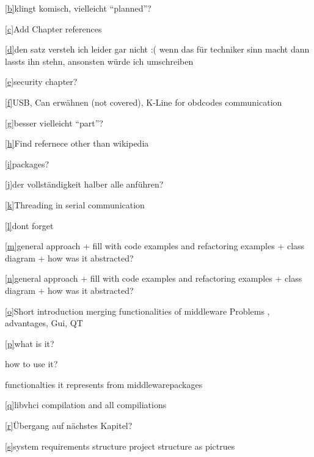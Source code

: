 \protect\hyperlink{cmntux5fref2}{{[}b{]}}{klingt komisch, vielleicht
``planned''?}

\protect\hyperlink{cmntux5fref3}{{[}c{]}}{Add Chapter references}

\protect\hyperlink{cmntux5fref4}{{[}d{]}}{den satz versteh ich leider
gar nicht :( wenn das für techniker sinn macht dann lassts ihn stehn,
ansonsten würde ich umschreiben}

\protect\hyperlink{cmntux5fref5}{{[}e{]}}{security chapter?}

\protect\hyperlink{cmntux5fref6}{{[}f{]}}{USB, Can erwähnen (not
covered), K-Line for obdcodes communication}

\protect\hyperlink{cmntux5fref7}{{[}g{]}}{besser vielleicht ``part''?}

\protect\hyperlink{cmntux5fref8}{{[}h{]}}{Find refernece other than
wikipedia}

\protect\hyperlink{cmntux5fref9}{{[}i{]}}{packages?}

\protect\hyperlink{cmntux5fref10}{{[}j{]}}{der vollständigkeit halber
alle anführen?}

\protect\hyperlink{cmntux5fref11}{{[}k{]}}{Threading in serial
communication}

\protect\hyperlink{cmntux5fref12}{{[}l{]}}{dont forget}

\protect\hyperlink{cmntux5fref13}{{[}m{]}}{general approach + fill with
code examples and refactoring examples + class diagram + how was it
abstracted?}

\protect\hyperlink{cmntux5fref14}{{[}n{]}}{general approach + fill with
code examples and refactoring examples + class diagram + how was it
abstracted?}

\protect\hyperlink{cmntux5fref15}{{[}o{]}}{Short introduction merging
functionalities of middleware Problems , advantages, Gui, QT}

\protect\hyperlink{cmntux5fref16}{{[}p{]}}{what is it?}

{how to use it?}

{functionalties it represents from middlewarepackages}

\protect\hyperlink{cmntux5fref17}{{[}q{]}}{libvhci compilation and all
compiliations}

\protect\hyperlink{cmntux5fref18}{{[}r{]}}{Übergang auf nächstes
Kapitel?}

\protect\hyperlink{cmntux5fref19}{{[}s{]}}{system requirements structure
project structure as pictrues}
